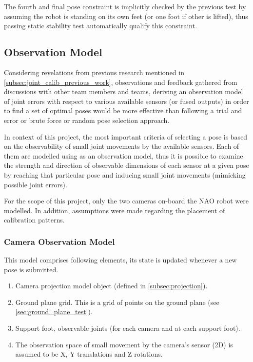 \documentclass[english, printversion, nomenclature, notitle]{tuvisionthesis} %
\begin{document}
The fourth and final pose constraint is implicitly checked by the previous test by assuming the robot is standing on its own feet (or one foot if other is lifted), thus passing static stability test automatically qualify this constraint.

\subsection{Observation Model}
Considering revelations from previous research mentioned in \cref{subsec:joint_calib_previous_work}, observations and feedback gathered from discussions with other team members and teams, deriving an observation model of joint errors with respect to various available sensors (or fused outputs) in order to find a set of optimal poses would be more effective than following a trial and error or brute force or random pose selection approach.

In context of this project, the most important criteria of selecting a pose is based on the observability of small joint movements by the available sensors. Each of them are modelled using as an observation model, thus it is possible to examine the strength and direction of observable dimensions of each sensor at a given pose by reaching that particular pose and inducing small joint movements (mimicking possible joint errors).

For the scope of this project, only the two cameras on-board the NAO robot were modelled. In addition, assumptions were made regarding the placement of calibration patterns.

\subsubsection{Camera Observation Model}
\label{subsec:cam_obs_model}
This model comprises following elements, its state is updated whenever a new pose is submitted. 
\begin{enumerate}
	\item Camera projection model object (defined in \cref{subsec:projection}).
	\item Ground plane grid. This is a grid of points on the ground plane (see \cref{sec:ground_plane_test}).
	\item Support foot, observable joints (for each camera and at each support foot).
	\item The observation space of small movement by the camera's sensor (2D) is assumed to be X, Y translations and Z rotations.
	\label{list:model}
\end{enumerate}
\end{document}
